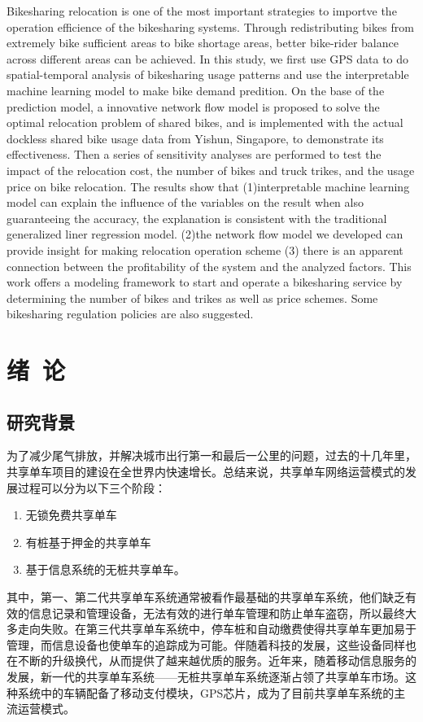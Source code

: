 \documentclass[]{tongjithesis}
\numberwithin{equation}{chapter}
\begin{document}
\begin{eabstract}
	Bikesharing relocation is one of the most important strategies to importve the operation efficience of the bikesharing systems. 
	Through redistributing bikes from extremely bike sufficient areas to bike shortage areas, better bike-rider balance across different areas can be achieved. In this study, we first use GPS data to do spatial-temporal analysis of bikesharing usage patterns and use the interpretable machine learning model to make bike demand predition. On the base of the prediction model, a innovative network flow model is proposed to solve the optimal relocation problem of shared bikes, and is implemented with the actual dockless shared bike usage data from Yishun, Singapore, to demonstrate its effectiveness. Then a series of sensitivity analyses are performed to test the impact of the relocation cost, the number of bikes and truck trikes, and the usage price on bike relocation. The results show that (1)interpretable machine learning model can explain the influence of the variables on the result when also guaranteeing the accuracy, the explanation is consistent with the traditional generalized liner regression model. (2)the network flow model we developed can provide insight for making relocation operation scheme (3) there is an apparent connection between the profitability of the system and the analyzed factors. This work offers a modeling framework to start and operate a bikesharing service by determining the number of bikes and trikes as well as price schemes. Some bikesharing regulation policies are also suggested.
\end{eabstract}

\toc

\mainmatter

\chapter{绪~论}
\section{研究背景}
为了减少尾气排放，并解决城市出行第一和最后一公里的问题，过去的十几年里，共享单车项目的建设在全世界内快速增长。总结来说，共享单车网络运营模式的发展过程可以分为以下三个阶段：
\begin{enumerate}
	\item 无锁免费共享单车
	\item 有桩基于押金的共享单车
	\item 基于信息系统的无桩共享单车\cite{demaio2009bike,shaheen2010bikesharing,fishman2016bikeshare}。
\end{enumerate}
其中，第一、第二代共享单车系统通常被看作最基础的共享单车系统，他们缺乏有效的信息记录和管理设备，无法有效的进行单车管理和防止单车盗窃，所以最终大多走向失败。在第三代共享单车系统中，停车桩和自动缴费使得共享单车更加易于管理，而信息设备也使单车的追踪成为可能。伴随着科技的发展，这些设备同样也在不断的升级换代，从而提供了越来越优质的服务。近年来，随着移动信息服务的发展，新一代的共享单车系统——无桩共享单车系统逐渐占领了共享单车市场。这种系统中的车辆配备了移动支付模块，GPS芯片，成为了目前共享单车系统的主流运营模式。
\end{document}
